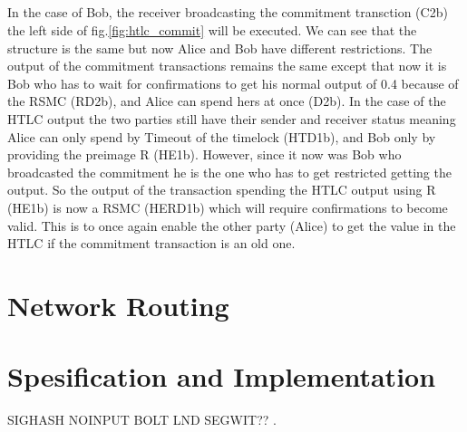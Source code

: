 \documentclass[informationsecurity]{gucmasterproject}
\begin{document}
\paragraph{}
In the case of Bob, the receiver broadcasting the commitment transction (C2b) the left side of fig.\ref{fig:htlc_commit} will be executed. We can see that the structure is the same but now Alice and Bob have different restrictions. The output of the commitment transactions remains the same except that now it is Bob who has to wait for confirmations to get his normal output of 0.4 because of the RSMC (RD2b), and Alice can spend hers at once (D2b). In the case of the HTLC output the two parties still have their sender and receiver status meaning Alice can only spend by Timeout of the timelock (HTD1b), and Bob only by providing the preimage R (HE1b). However, since it now was Bob who broadcasted the commitment he is the one who has to get restricted getting the output. So the output of the transaction spending the HTLC output using R (HE1b) is now a RSMC (HERD1b) which will require confirmations to become valid. This is to once again enable the other party (Alice) to get the value in the HTLC if the commitment transaction is an old one.  

\paragraph{}



\chapter{Network Routing}


\chapter{Spesification and Implementation}
SIGHASH NOINPUT
BOLT 
LND
SEGWIT??
.






%

\end{document}
